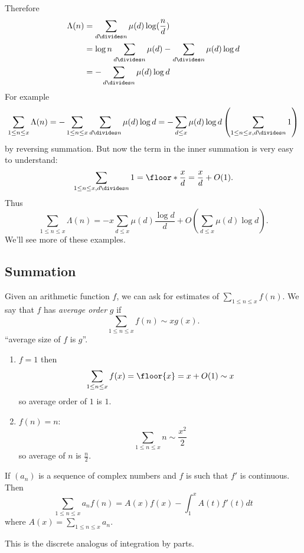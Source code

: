\documentclass[a4paper]{article}
\begin{document}
Therefore
\begin{align*}
  \Lambda(n)
  &= \sum_{d \divides n} \mu(d) \log(\frac{n}{d}) \\
  &= \log n \sum_{d \divides n} \mu(d) - \sum_{d \divides n} \mu(d) \log d \\
  &= - \sum_{d \divides n} \mu(d) \log d
\end{align*}
For example
\[
  \sum_{1 \leq n \leq x} \Lambda(n)
  = - \sum_{1 \leq n \leq x} \sum_{d \divides n} \mu(d) \log d
  = - \sum_{d \leq x} \mu(d) \log d \left(\sum_{1 \leq n \leq x, d \divides n} 1\right)
\]
by reversing summation. But now the term in the inner summation is very easy to understand:
\[
  \sum_{1 \leq n \leq x, d \divides n} 1 = \floor*{\frac{x}{d}} = \frac{x}{d} + O(1).
\]
Thus
\[
  \sum_{1 \leq n \leq x} \Lambda(n)
  = -x \sum_{d \leq x} \mu(d) \frac{\log d}{d} + O\left(\sum_{d \leq x} \mu(d) \log d\right).
\]
We'll see more of these examples.

\subsection{Summation}

Given an arithmetic function \(f\), we can ask for estimates of \(\sum_{1 \leq n \leq x} f(n)\). We say that \(f\) has \emph{average order} \(g\) if
\[
  \sum_{1 \leq n \leq x} f(n) \sim x g(x).
\]
``average size of \(f\) is \(g\)''.

\begin{eg}\leavevmode
  \begin{enumerate}
  \item \(f = 1\) then
    \[
      \sum_{1 \leq n \leq x} f(x) = \floor{x} = x + O(1) \sim x
    \]
    so average order of \(1\) is \(1\).
  \item \(f(n) = n\):
    \[
      \sum_{1 \leq n \leq x} n \sim \frac{x^2}{2}
    \]
    so average of \(n\) is \(\frac{n}{2}\).
  \end{enumerate}
\end{eg}

\begin{lemma}
  If \((a_n)\) is a sequence of complex numbers and \(f\) is such that \(f'\) is continuous. Then
  \[
    \sum_{1 \leq n \leq x} a_n f(n) = A(x) f(x) - \int_1^x A(t)f'(t) dt
  \]
  where \(A(x) = \sum_{1 \leq n \leq x} a_n\).
\end{lemma}

This is the discrete analogus of integration by parts.
\end{document}
